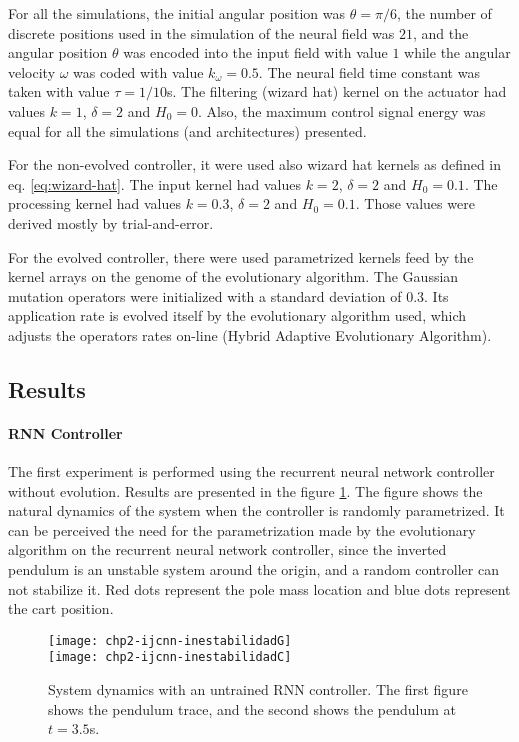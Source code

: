 For all the simulations, the initial angular position was
$\theta=\pi/6$, the number of discrete positions used in the
simulation of the neural field was $21$, and the angular position
$\theta$ was encoded into the input field with value $1$ while the
angular velocity $\omega$ was coded with value $k_\omega=0.5$. The
neural field time constant was taken with value $\tau=1/10$s. The
filtering (wizard hat) kernel on the actuator had values $k=1$,
$\delta=2$ and $H_0=0$. Also, the maximum control signal energy was
equal for all the simulations (and architectures) presented.

For the non-evolved controller, it were used also wizard hat kernels
as defined in eq. \ref{eq:wizard-hat}. The input kernel had values
$k=2$, $\delta=2$ and $H_0=0.1$. The processing kernel had values
$k=0.3$, $\delta=2$ and $H_0=0.1$. Those values were derived mostly by
trial-and-error.

For the evolved controller, there were used parametrized kernels feed
by the kernel arrays on the genome of the evolutionary algorithm. The
Gaussian mutation operators were initialized with a standard deviation
of 0.3. Its application rate is evolved itself by the evolutionary
algorithm used, which adjusts the operators rates on-line (Hybrid
Adaptive Evolutionary Algorithm).

\subsection*{Results}
\paragraph{RNN Controller}
The first experiment is performed using the recurrent neural network
controller without evolution. Results are presented in the figure
\ref{inestabilidad}. The figure shows the natural dynamics of the
system when the controller is randomly parametrized. It can be
perceived the need for the parametrization made by the evolutionary
algorithm on the recurrent neural network controller, since the
inverted pendulum is an unstable system around the origin, and a
random controller can not stabilize it. Red dots represent the pole
mass location and blue dots represent the cart position.

\begin{figure}[h]
  \centering
  \texttt{[image: chp2-ijcnn-inestabilidadG]}
  \\
  \texttt{[image: chp2-ijcnn-inestabilidadC]}
  \caption{System dynamics with an untrained RNN controller. The first
    figure shows the pendulum trace, and the second shows the pendulum
    at $t=3.5$s.}
  \label{inestabilidad}
\end{figure}


